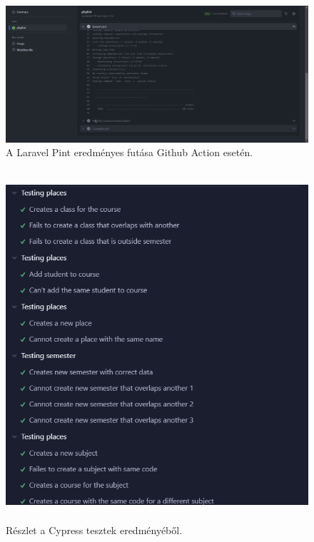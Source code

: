 \documentclass[
]{thesis-ekf}
\theoremstyle{definition}
\theoremstyle{remark}
\begin{document}
\begin{figure}[ht!]
	\centering
	\includegraphics[width=16cm]{../pictures/screenshots/githubActions.png}
	\caption{A Laravel Pint eredményes futása Github Action esetén.}
	\label{githubActions}
\end{figure}

\begin{figure}[ht!]
	\centering
	\includegraphics[height=13cm]{../pictures/screenshots/cypress_tests.png}
	\caption{Részlet a Cypress tesztek eredményéből.}
	\label{cypressResult}
\end{figure}
\end{document}

